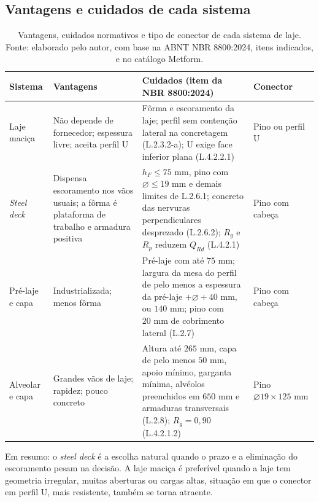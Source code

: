 \documentclass[11pt,a4paper]{article}
\begin{document}
\subsection{Vantagens e cuidados de cada sistema}

\begin{table}[!htbp]
  \centering
  \caption{Vantagens, cuidados normativos e tipo de conector de cada sistema de laje. Fonte: elaborado pelo autor, com base na ABNT NBR 8800:2024, itens indicados, e no catálogo Metform.}
  \label{tab:sistemas-laje}
  \footnotesize
  \begin{tabularx}{\linewidth}{lXXl}
    \toprule
    \textbf{Sistema} & \textbf{Vantagens} & \textbf{Cuidados (item da NBR 8800:2024)} & \textbf{Conector} \\
    \midrule
    Laje maciça & Não depende de fornecedor; espessura livre; aceita perfil U & Fôrma e escoramento da laje; perfil sem contenção lateral na concretagem (L.2.3.2-a); U exige face inferior plana (L.4.2.2.1) & Pino ou perfil U \\
    \addlinespace
    \textit{Steel deck} & Dispensa escoramento nos vãos usuais; a fôrma é plataforma de trabalho e armadura positiva & $h_F \le 75\text{ mm}$, pino com $\varnothing \le 19\text{ mm}$ e demais limites de L.2.6.1; concreto das nervuras perpendiculares desprezado (L.2.6.2); $R_g$ e $R_p$ reduzem $Q_{Rd}$ (L.4.2.1) & Pino com cabeça \\
    \addlinespace
    Pré-laje e capa & Industrializada; menos fôrma & Pré-laje com até $75\text{ mm}$; largura da mesa do perfil de pelo menos a espessura da pré-laje $+ \varnothing + 40\text{ mm}$, ou $140\text{ mm}$; pino com $20\text{ mm}$ de cobrimento lateral (L.2.7) & Pino com cabeça \\
    \addlinespace
    Alveolar e capa & Grandes vãos de laje; rapidez; pouco concreto & Altura até $265\text{ mm}$, capa de pelo menos $50\text{ mm}$, apoio mínimo, garganta mínima, alvéolos preenchidos em $650\text{ mm}$ e armaduras transversais (L.2.8); $R_g = 0{,}90$ (L.4.2.1.2) & Pino $\varnothing 19 \times 125\text{ mm}$ \\
    \bottomrule
  \end{tabularx}
\end{table}

Em resumo: o \textit{steel deck} é a escolha natural quando o prazo e a eliminação do escoramento pesam na decisão. A laje maciça é preferível quando a laje tem geometria irregular, muitas aberturas ou cargas altas, situação em que o conector em perfil U, mais resistente, também se torna atraente.
\end{document}
